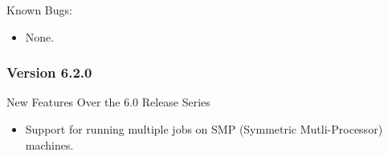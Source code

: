 \noindent Known Bugs:

\begin{itemize}

\item None.

\end{itemize}


\subsubsection{\label{sec:New-6-2-0}Version 6.2.0}

\noindent New Features Over the 6.0 Release Series
\begin{itemize}

\item Support for running multiple jobs on SMP (Symmetric Mutli-Processor)
machines.

\end{itemize}

